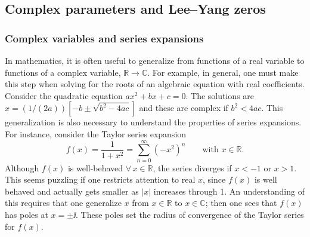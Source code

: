 \subsection{Complex parameters and Lee--Yang zeros}
\subsubsection*{Complex variables and series expansions}

In mathematics, it is often useful to generalize from functions of a real variable to functions of a
complex variable, $\mathbb R\to\mathbb C$. For example, in general, one must make this step when solving for
the roots of an algebraic equation with real coefficients. Consider the quadratic equation
$ax^2+bx+c = 0$. The solutions are $x = (1/(2a))\left[-b\pm\sqrt{b^2-4ac}\right]$ and these are complex if
$b^2<4ac$. This generalization is also necessary to understand the properties of series expansions. For
instance, consider the Taylor series expansion
\begin{equation}
  f(x) = \frac{1}{1+x^2} = \sum_{n=0}^\infty(-x^2)^n\qquad\text{with } x\in\mathbb R .
\end{equation}
Although $f(x)$ is well-behaved $\forall\,x\in\mathbb R$, the series diverges if $x<-1$ or $x>1$. This seems
puzzling if one restricts attention to real $x$, since $f(x)$ is well behaved and actually gets smaller as $|x|$
increases through 1. An understanding of this requires that one generalize $x$ from $x\in\mathbb R$ to
$x\in\mathbb C$; then one sees that $f(x)$ has poles at $x = \pm\ii$. These poles set the radius of convergence of
the Taylor series for $f(x)$.

\begin{diagram}
\end{diagram}

